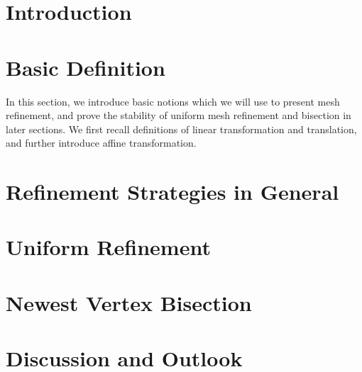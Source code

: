 \documentclass[english]{article}
\begin{document}
  

  \section{Introduction}
  

  \section{Basic Definition}
    In this section, we introduce basic notions which we will use to present mesh refinement, and prove the stability of uniform mesh refinement and bisection in later sections.
    We first recall definitions of linear transformation and translation, and further introduce affine transformation.

    
    
    
    


  \section{Refinement Strategies in General}
    

  \section{Uniform Refinement}
    

  \section{Newest Vertex Bisection}
    

  \section{Discussion and Outlook}
    

  \newpage
  
  
    
\end{document}
